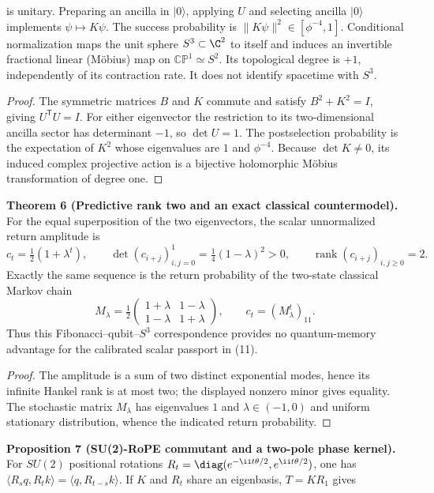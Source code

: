 \documentclass[11pt,a4paper,oneside]{book}
\DeclareMathOperator{\rank}{rank}\DeclareMathOperator{\Tr}{Tr}
\newcommand{\statement}[3]{\par\medskip\noindent\textbf{#1 #2 (#3).}\ }
\begin{document}
is unitary. Preparing an ancilla in $|0\rangle$, applying $U$ and selecting ancilla $|0\rangle$ implements $\psi\mapsto K\psi$. The success probability is $\|K\psi\|^2\in[\phi^{-4},1]$. Conditional normalization maps the unit sphere $S^3\subset\C^2$ to itself and induces an invertible fractional linear (M\"obius) map on $\mathbb{CP}^1\simeq S^2$. Its topological degree is $+1$, independently of its contraction rate. It does not identify spacetime with $S^3$.
\begin{proof}The symmetric matrices $B$ and $K$ commute and satisfy $B^2+K^2=I$, giving $U^{\mathsf T}U=I$. For either eigenvector the restriction to its two-dimensional ancilla sector has determinant $-1$, so $\det U=1$. The postselection probability is the expectation of $K^2$ whose eigenvalues are $1$ and $\phi^{-4}$. Because $\det K\ne0$, its induced complex projective action is a bijective holomorphic M\"obius transformation of degree one.\end{proof}
\statement{Theorem}{6}{Predictive rank two and an exact classical countermodel} For the equal superposition of the two eigenvectors, the scalar unnormalized return amplitude is
\begin{equation}c_t=\tfrac12(1+\lambda^t),\qquad\det(c_{i+j})_{i,j=0}^1=\tfrac14(1-\lambda)^2>0,\qquad\rank(c_{i+j})_{i,j\ge0}=2.\tag{11}\end{equation}
Exactly the same sequence is the return probability of the two-state classical Markov chain
\begin{equation}M_\lambda=\tfrac12\begin{pmatrix}1+\lambda&1-\lambda\\1-\lambda&1+\lambda\end{pmatrix},\qquad c_t=(M_\lambda^t)_{11}.\tag{12}\end{equation}
Thus this Fibonacci--qubit--$S^3$ correspondence provides no quantum-memory advantage for the calibrated scalar passport in (11).
\begin{proof}The amplitude is a sum of two distinct exponential modes, hence its infinite Hankel rank is at most two; the displayed nonzero minor gives equality. The stochastic matrix $M_\lambda$ has eigenvalues $1$ and $\lambda\in(-1,0)$ and uniform stationary distribution, whence the indicated return probability.\end{proof}
\statement{Proposition}{7}{SU(2)-RoPE commutant and a two-pole phase kernel} For $SU(2)$ positional rotations $R_t=\diag(e^{-\ii t\theta/2},e^{\ii t\theta/2})$, one has $\langle R_sq,R_tk\rangle=\langle q,R_{t-s}k\rangle$. If $K$ and $R_t$ share an eigenbasis, $T=KR_1$ gives
\end{document}
